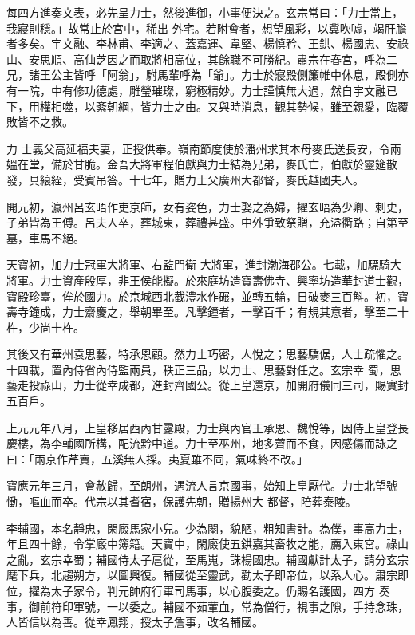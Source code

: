\begin{pinyinscope}
 每四方進奏文表，必先呈力士，然後進御，小事便決之。玄宗常曰：「力士當上，我寢則穩。」故常止於宮中，稀出
 外宅。若附會者，想望風彩，以冀吹噓，竭肝膽者多矣。宇文融、李林甫、李適之、蓋嘉運、韋堅、楊慎矜、王鉷、楊國忠、安祿山、安思順、高仙芝因之而取將相高位，其餘職不可勝紀。肅宗在春宮，呼為二兄，諸王公主皆呼「阿翁」，駙馬輩呼為「爺」。力士於寢殿側簾帷中休息，殿側亦有一院，中有修功德處，雕瑩璀璨，窮極精妙。力士謹慎無大過，然自宇文融已下，用權相噬，以紊朝綱，皆力士之由。又與時消息，觀其勢候，雖至親愛，臨覆敗皆不之救。



 力
 士義父高延福夫妻，正授供奉。嶺南節度使於潘州求其本母麥氏送長安，令兩媼在堂，備於甘脆。金吾大將軍程伯獻與力士結為兄弟，麥氏亡，伯獻於靈筵散發，具縗絰，受賓吊答。十七年，贈力士父廣州大都督，麥氏越國夫人。



 開元初，瀛州呂玄晤作吏京師，女有姿色，力士娶之為婦，擢玄晤為少卿、刺史，子弟皆為王傅。呂夫人卒，葬城東，葬禮甚盛。中外爭致祭贈，充溢衢路；自第至墓，車馬不絕。



 天寶初，加力士冠軍大將軍、右監門衛
 大將軍，進封渤海郡公。七載，加驃騎大將軍。力士資產殷厚，非王侯能擬。於來庭坊造寶壽佛寺、興寧坊造華封道士觀，寶殿珍臺，侔於國力。於京城西北截澧水作碾，並轉五輪，日破麥三百斛。初，寶壽寺鐘成，力士齋慶之，舉朝畢至。凡擊鐘者，一擊百千；有規其意者，擊至二十杵，少尚十杵。



 其後又有華州袁思藝，特承恩顧。然力士巧密，人悅之；思藝驕倨，人士疏懼之。十四載，置內侍省內侍監兩員，秩正三品，以力士、思藝對任之。玄宗幸
 蜀，思藝走投祿山，力士從幸成都，進封齊國公。從上皇還京，加開府儀同三司，賜實封五百戶。



 上元元年八月，上皇移居西內甘露殿，力士與內官王承恩、魏悅等，因侍上皇登長慶樓，為李輔國所構，配流黔中道。力士至巫州，地多薺而不食，因感傷而詠之曰：「兩京作芹賣，五溪無人採。夷夏雖不同，氣味終不改。」



 寶應元年三月，會赦歸，至朗州，遇流人言京國事，始知上皇厭代。力士北望號慟，嘔血而卒。代宗以其耆宿，保護先朝，贈揚州大
 都督，陪葬泰陵。



 李輔國，本名靜忠，閑廄馬家小兒。少為閹，貌陋，粗知書計。為僕，事高力士，年且四十餘，令掌廄中簿籍。天寶中，閑廄使五鉷嘉其畜牧之能，薦入東宮。祿山之亂，玄宗幸蜀；輔國侍太子扈從，至馬嵬，誅楊國忠。輔國獻計太子，請分玄宗麾下兵，北趨朔方，以圖興復。輔國從至靈武，勸太子即帝位，以系人心。肅宗即位，擢為太子家令，判元帥府行軍司馬事，以心腹委之。仍賜名護國，四方
 奏事，御前符印軍號，一以委之。輔國不茹葷血，常為僧行，視事之隙，手持念珠，人皆信以為善。從幸鳳翔，授太子詹事，改名輔國。




\end{pinyinscope}
